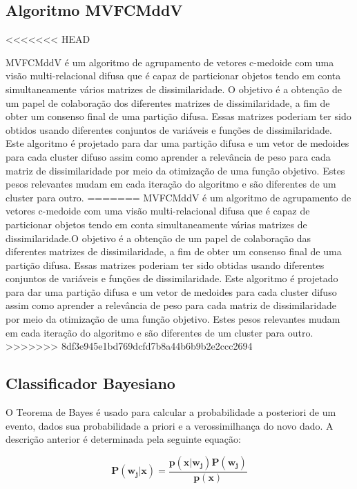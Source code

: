 \documentclass[12pt]{article}
\begin{document}
\subsection{Algoritmo MVFCMddV}
<<<<<<< HEAD

MVFCMddV é um algoritmo de agrupamento de vetores c-medoide com uma visão multi-relacional difusa que é capaz de particionar objetos tendo em conta simultaneamente vários matrizes de dissimilaridade. O objetivo é a obtenção de um papel de colaboração dos diferentes matrizes de dissimilaridade, a fim de obter um consenso final de uma partição difusa.
Essas matrizes poderiam ter sido obtidos usando diferentes conjuntos de variáveis e funções de dissimilaridade. Este algoritmo é projetado para dar uma partição difusa e um vetor de medoides para cada cluster difuso assim como aprender a relevância de peso para cada matriz de dissimilaridade por meio da otimização de uma função objetivo. Estes pesos relevantes mudam em cada iteração do algoritmo e são diferentes de um cluster para outro.
=======
MVFCMddV é um algoritmo de agrupamento de vetores c-medoide com uma visão multi-relacional difusa que é capaz de particionar objetos tendo em conta simultaneamente várias matrizes de dissimilaridade.O objetivo é a obtenção de um papel de colaboração das diferentes matrizes de dissimilaridade, a fim de obter um consenso final de uma partição difusa.
Essas matrizes poderiam ter sido obtidas usando diferentes conjuntos de variáveis e funções de dissimilaridade. Este algoritmo é projetado para dar uma partição difusa e um vetor de medoides para cada cluster difuso assim como aprender a relevância de peso para cada matriz de dissimilaridade por meio da otimização de uma função objetivo. Estes pesos relevantes mudam em cada iteração do algoritmo e são diferentes de um cluster para outro.
>>>>>>> 8df3e945e1bd769dcfd7b8a44b6b9b2e2ccc2694


\subsection{Classificador Bayesiano}

O Teorema de Bayes é usado para calcular a probabilidade a posteriori de um evento, dados sua probabilidade a priori e a verossimilhança do novo dado. A descrição anterior é determinada pela seguinte equação:

\begin{equation}
\mathbf{P(w_j\vert x)= \dfrac{p(x\vert w_j) P(w_j)}{p(x)} }
\end{equation}
\end{document}
